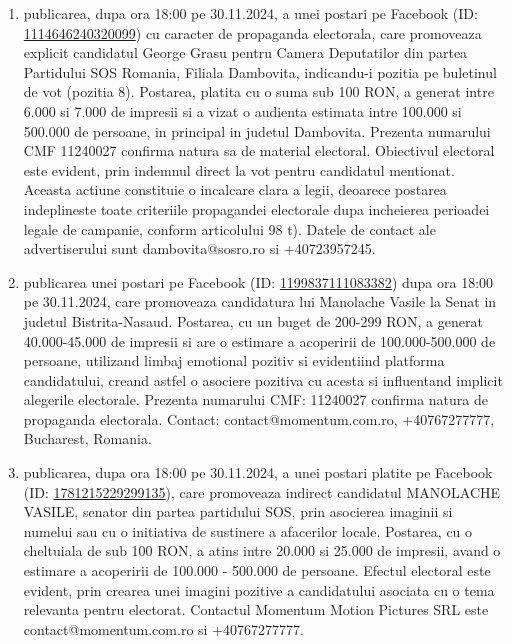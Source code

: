 \documentclass[a4paper,12pt]{article}
\begin{document}
\begin{enumerate}[leftmargin=*, label=\arabic*.)]
    \item publicarea, dupa ora 18:00 pe 30.11.2024, a unei postari pe Facebook (ID: \href{https://www.facebook.com/ads/library/?id=1114646240320099}{1114646240320099}) cu caracter de propaganda electorala, care promoveaza explicit candidatul George Grasu pentru Camera Deputatilor din partea Partidului SOS Romania, Filiala Dambovita, indicandu-i pozitia pe buletinul de vot (pozitia 8).  Postarea, platita cu o suma sub 100 RON, a generat intre 6.000 si 7.000 de impresii si a vizat o audienta estimata intre 100.000 si 500.000 de persoane, in principal in judetul Dambovita.  Prezenta numarului CMF 11240027 confirma natura sa de material electoral. Obiectivul electoral este evident, prin indemnul direct la vot pentru candidatul mentionat.  Aceasta actiune constituie o incalcare clara a legii, deoarece postarea indeplineste toate criteriile propagandei electorale dupa incheierea perioadei legale de campanie, conform articolului 98 t).  Datele de contact ale advertiserului sunt dambovita@sosro.ro si +40723957245.
    \item publicarea unei postari pe Facebook (ID: \href{https://www.facebook.com/ads/library/?id=1199837111083382}{1199837111083382}) dupa ora 18:00 pe 30.11.2024, care promoveaza candidatura lui Manolache Vasile la Senat in judetul Bistrita-Nasaud. Postarea, cu un buget de 200-299 RON, a generat 40.000-45.000 de impresii si are o estimare a acoperirii de 100.000-500.000 de persoane, utilizand limbaj emotional pozitiv si evidentiind platforma candidatului, creand astfel o asociere pozitiva cu acesta si influentand implicit alegerile electorale. Prezenta numarului CMF: 11240027 confirma natura de propaganda electorala.  Contact: contact@momentum.com.ro, +40767277777, Bucharest, Romania.
    \item publicarea, dupa ora 18:00 pe 30.11.2024, a unei postari platite pe Facebook (ID: \href{https://www.facebook.com/ads/library/?id=1781215229299135}{1781215229299135}), care promoveaza indirect candidatul MANOLACHE VASILE, senator din partea partidului SOS, prin asocierea imaginii si numelui sau cu o initiativa de sustinere a afacerilor locale.  Postarea, cu o cheltuiala de sub 100 RON, a atins intre 20.000 si 25.000 de impresii, avand o estimare a acoperirii de 100.000 - 500.000 de persoane.  Efectul electoral este evident, prin crearea unei imagini pozitive a candidatului asociata cu o tema relevanta pentru electorat.  Contactul Momentum Motion Pictures SRL este contact@momentum.com.ro si +40767277777.

\end{enumerate}
\end{document}
